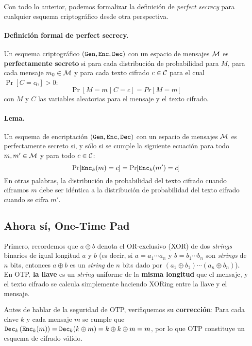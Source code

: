 Con todo lo anterior, podemos formalizar la definición de \textit{perfect secrecy} para cualquier esquema criptográfico desde otra perspectiva.

\paragraph*{Definición formal de perfect secrecy.} Un esquema criptográfico $(\texttt{Gen}, \texttt{Enc}, \texttt{Dec})$ con un espacio de mensajes $\mathcal{M}$ es \textbf{perfectamente secreto} si para cada distribución de probabilidad para $M$, para cada mensaje $m_0 \in \mathcal{M}$ y para cada texto cifrado $c \in \mathcal{C}$ para el cual $\Pr[C = c_0] > 0$:
$$
    \Pr[M = m \mid C = c] = Pr[M = m]
$$
con $M$ y $C$ las variables aleatorias para el mensaje y el texto cifrado.
\paragraph*{Lema.} Un esquema de encriptación $(\texttt{Gen}, \texttt{Enc}, \texttt{Dec})$ con un espacio de mensajes $\mathcal{M}$ es perfectamente secreto si, y sólo si se cumple la siguiente ecuación para todo $m, m' \in \mathcal{M}$ y para todo $c \in \mathcal{C}$:
$$
    \Pr[\texttt{Enc}_k(m) = c] = \Pr[\texttt{Enc}_k(m') = c]
$$
En otras palabras, la distribución de probabilidad del texto cifrado cuando ciframos $m$ debe ser idéntica a la distribución de probabilidad del texto cifrado cuando se cifra $m'$.

\subsection{Ahora sí, One-Time Pad}

Primero, recordemos que $a \oplus b$ denota el OR-exclusivo (XOR) de dos \textit{strings} binarios de igual longitud $a$ y $b$ (es decir, si $a=a_1 \cdots a_n$ y $b=b_1 \cdots b_n$ son \textit{strings} de $n$ bits, entonces $a \oplus b$ es un \textit{string} de $n$ bits dado por $\left(a_1 \oplus b_1\right) \cdots\left(a_n \oplus b_n\right)$). En OTP, \textbf{la llave} es un \textit{string} uniforme de la \textbf{misma longitud} que el mensaje, y el texto cifrado se calcula simplemente haciendo XORing entre la llave y el mensaje. \medbreak

Antes de hablar de la seguridad de OTP, verifiquemos su \textbf{corrección}: Para cada clave $k$ y cada mensaje $m$ se cumple que $\texttt{Dec}_k\left(\texttt{Enc}_k(m)\right) = \texttt{Dec}_k(k \oplus m) = k \oplus k \oplus m=m$, por lo que OTP constituye un esquema de cifrado válido.
